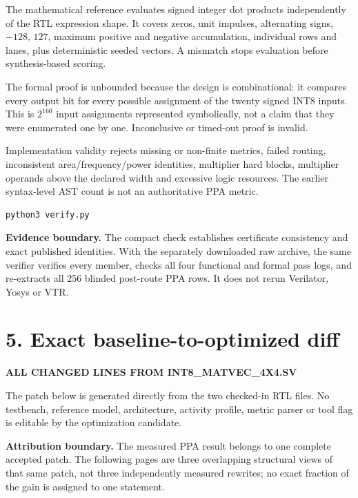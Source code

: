 \documentclass[10pt,a4paper]{article}
\newcommand{\smallcaps}[1]{\textcolor{Mid}{\fontsize{8.5}{10}\selectfont\bfseries\MakeUppercase{#1}}}
\newcommand{\newpageheading}[2]{\clearpage\section{#1}\smallcaps{#2}\vspace{6pt}}
\begin{document}
The mathematical reference evaluates signed integer dot products independently of the RTL expression shape. It covers zeros, unit impulses, alternating signs, $-128$, $127$, maximum positive and negative accumulation, individual rows and lanes, plus deterministic seeded vectors. A mismatch stops evaluation before synthesis-based scoring.

The formal proof is unbounded because the design is combinational: it compares every output bit for every possible assignment of the twenty signed INT8 inputs. This is $2^{160}$ input assignments represented symbolically, not a claim that they were enumerated one by one. Inconclusive or timed-out proof is invalid.

Implementation validity rejects missing or non-finite metrics, failed routing, inconsistent area/frequency/power identities, multiplier hard blocks, multiplier operands above the declared width and excessive logic resources. The earlier syntax-level AST count is not an authoritative PPA metric.

\begin{lstlisting}
python3 verify.py
\end{lstlisting}

\begin{claimbox}
\textbf{Evidence boundary.} The compact check establishes certificate consistency and exact published identities. With the separately downloaded raw archive, the same verifier verifies every member, checks all four functional and formal pass logs, and re-extracts all 256 blinded post-route PPA rows. It does not rerun Verilator, Yosys or VTR.
\end{claimbox}

\newpageheading{5. Exact baseline-to-optimized diff}{All changed lines from int8\_matvec\_4x4.sv}

The patch below is generated directly from the two checked-in RTL files. No testbench, reference model, architecture, activity profile, metric parser or tool flag is editable by the optimization candidate.



\begin{scopebox}
\textbf{Attribution boundary.} The measured PPA result belongs to one complete accepted patch. The following pages are three overlapping structural views of that same patch, not three independently measured rewrites; no exact fraction of the gain is assigned to one statement.
\end{scopebox}
\end{document}
